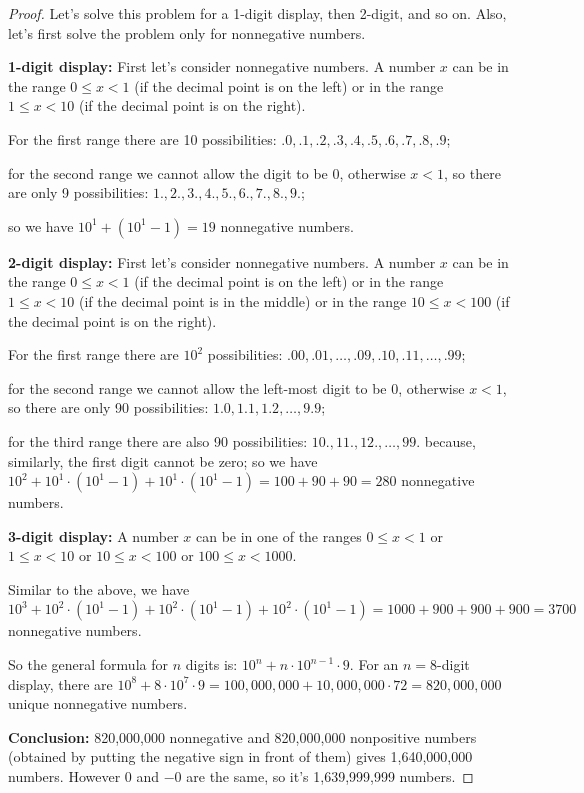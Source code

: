 \documentclass[14pt]{extarticle}
\begin{document}
\begin{proof}
     Let's solve this problem for a 1-digit display, then 2-digit, and so on. Also, let's first solve the problem only
     for nonnegative numbers.

          {\bf 1-digit display:} First let's consider nonnegative numbers. A number $x$ can be in the range \(0 \leq x < 1\)
     (if the decimal point is on the left) or in the range \(1 \leq x < 10\) (if the decimal point is on the right).

     For the first range there are 10 possibilities: \(.0, .1, .2, .3, .4, .5, .6, .7, .8, .9\);

     for the second range we cannot allow the digit to be 0, otherwise \(x < 1\), so there are only 9 possibilities:
     \(1., 2., 3., 4., 5., 6., 7., 8., 9.\);

     so we have \(10^1 + (10^1 - 1) = 19\) nonnegative numbers.

          {\bf 2-digit display:} First let's consider nonnegative numbers. A number $x$ can be in the range \(0 \leq x < 1\)
     (if the decimal point is on the left) or in the range \(1 \leq x < 10\) (if the decimal point is in the middle) or in
     the range \(10 \leq x < 100\) (if the decimal point is on the right).

     For the first range there are \(10^2\) possibilities: \(.00, .01, \ldots, .09, .10, .11, \ldots, .99\);

     for the second range we cannot allow the left-most digit to be 0, otherwise \(x < 1\), so there are only 90
     possibilities: \(1.0, 1.1, 1.2, \ldots, 9.9\);

     for the third range there are also 90 possibilities: \(10., 11., 12., \ldots, 99.\) because, similarly, the first digit
     cannot be zero; so we have \(10^2 + 10^1 \cdot (10^1 - 1) + 10^1 \cdot (10^1 - 1) = 100 + 90 + 90 = 280\) nonnegative
     numbers.

          {\bf 3-digit display:} A number $x$ can be in one of the ranges \(0 \leq x < 1\) or \(1 \leq x < 10\) or \(10 \leq x
     < 100\) or \(100 \leq x < 1000\).

     Similar to the above, we have \(10^3 + 10^2 \cdot (10^1 - 1) + 10^2 \cdot (10^1 - 1) + 10^2 \cdot (10^1 - 1) =
     1000 + 900 + 900 + 900 = 3700\) nonnegative numbers.

     So the general formula for $n$ digits is: \(10^n + n \cdot 10^{n-1} \cdot 9\). For an $n=8$-digit display, there are
     \(10^8 + 8 \cdot 10^7 \cdot 9 = 100,000,000 + 10,000,000 \cdot 72 = 820,000,000\) unique nonnegative numbers.

          {\bf Conclusion:} 820,000,000 nonnegative and 820,000,000 nonpositive numbers (obtained by putting the negative sign
     in front of them) gives 1,640,000,000 numbers. However 0 and \(-0\) are the same, so it's 1,639,999,999 numbers.
\end{proof}
\end{document}
